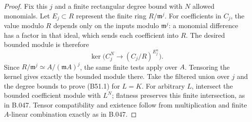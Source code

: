 \begin{proof}
Fix this $j$ and a finite rectangular degree bound
with $N$ allowed monomials. Let $E_j\subset R$
represent the finite ring $R/\mathfrak m^j$.
For coefficients in $C_j$, the value modulo $R$
depends only on the inputs modulo $\mathfrak m^j$:
a monomial difference has a factor in that ideal,
which sends each coefficient into $R$.
The desired bounded module is therefore
\[
 \ker\bigl(C_j^N\longrightarrow(C_j/R)^{E_j^n}\bigr).
\]
Since $R/\mathfrak m^j\simeq A/(\mathfrak m A)^j$,
the same finite tests apply over $A$. Tensoring the
kernel gives exactly the bounded module there.
Take the filtered union over $j$ and the degree
bounds to prove (B51.1) for $L=K$.
For arbitrary $L$, intersect the bounded coefficient
module with $L^N$; flatness preserves this finite
intersection, as in B.047. Tensor compatibility and
existence follow from multiplication and finite
$A$-linear combination exactly as in B.047.
\end{proof}

